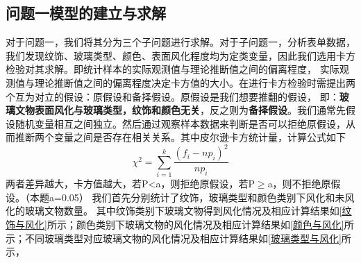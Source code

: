 \documentclass{MathModeling}
\begin{document}
	\subsection{问题一模型的建立与求解}
	对于问题一，我们将其分为三个子问题进行求解。{\heiti 对于子问题一}，分析表单数据，我们发现纹饰、玻璃类型、颜色、表面风化程度均为定类变量，因此我们选用卡方检验对其求解。即统计样本的实际观测值与理论推断值之间的偏离程度，
	实际观测值与理论推断值之间的偏离程度决定卡方值的大小。在进行卡方检验时需提出两个互为对立的假设：原假设和备择假设。原假设是我们想要推翻的假设，
	即：{\textbf{玻璃文物表面风化与玻璃类型，纹饰和颜色无关}}，反之则为{\textbf{备择假设}}。我们通常先假设随机变量相互之间独立。然后通过观察样本数据来判断是否可以拒绝原假设，从而推断两个变量之间是否存在相关关系。其中皮尔逊卡方统计量，计算公式如下
	\begin{equation}
	\chi^2=\sum_{i=1}^{k}\frac{\left( f_i-np_i \right) ^2}{np_i}
	\end{equation}
	两者差异越大，卡方值越大，若P<a，则拒绝原假设，若P$\geq$a，则不拒绝原假设。（本题a=0.05）
	我们首先分别统计了纹饰，玻璃类型和颜色类别下风化和未风化的玻璃文物数量。
	其中纹饰类别下玻璃文物得到风化情况及相应计算结果如\textcolor{blue}{\cref{纹饰与风化}}所示；颜色类别下玻璃文物的风化情况及相应计算结果如\textcolor{blue}{\cref{颜色与风化}}所示；不同玻璃类型对应玻璃文物的风化情况及相应计算结果如\textcolor{blue}{\cref{玻璃类型与风化}}所示，	
	
\end{document}
